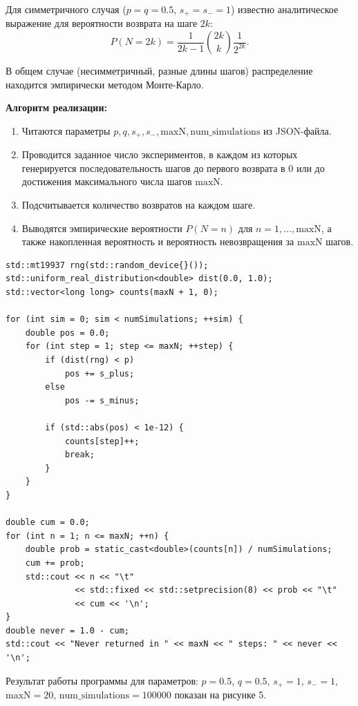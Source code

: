 \documentclass[a4paper]{article}
\theoremstyle{definition}
\begin{document}
Для симметричного случая ($p=q=0.5$, $s_+=s_-=1$) известно аналитическое выражение для вероятности возврата на шаге $2k$:
\begin{equation}
    P(N = 2k) = \frac{1}{2k-1} \binom{2k}{k} \frac{1}{2^{2k}}. \tag{5.3}
\end{equation}

В общем случае (несимметричный, разные длины шагов) распределение находится эмпирически методом Монте-Карло.

\textbf{Алгоритм реализации:}

\begin{enumerate}
    \item Читаются параметры $p, q, s_+, s_-, \text{maxN}, \text{num\_simulations}$ из JSON-файла.
    \item Проводится заданное число экспериментов, в каждом из которых генерируется последовательность шагов до первого возврата в 0 или до достижения максимального числа шагов $\text{maxN}$.
    \item Подсчитывается количество возвратов на каждом шаге.
    \item Выводятся эмпирические вероятности $P(N = n)$ для $n = 1, \dots, \text{maxN}$, а также накопленная вероятность и вероятность невозвращения за $\text{maxN}$ шагов.
\end{enumerate}

\begin{lstlisting}[caption={Основной алгоритм моделирования одномерного блуждания}, label=lst5]
std::mt19937 rng(std::random_device{}());
std::uniform_real_distribution<double> dist(0.0, 1.0);
std::vector<long long> counts(maxN + 1, 0);

for (int sim = 0; sim < numSimulations; ++sim) {
    double pos = 0.0;
    for (int step = 1; step <= maxN; ++step) {
        if (dist(rng) < p)
            pos += s_plus;
        else
            pos -= s_minus;

        if (std::abs(pos) < 1e-12) {
            counts[step]++;
            break;
        }
    }
}

double cum = 0.0;
for (int n = 1; n <= maxN; ++n) {
    double prob = static_cast<double>(counts[n]) / numSimulations;
    cum += prob;
    std::cout << n << "\t"
              << std::fixed << std::setprecision(8) << prob << "\t"
              << cum << '\n';
}
double never = 1.0 - cum;
std::cout << "Never returned in " << maxN << " steps: " << never << '\n';
\end{lstlisting}

Результат работы программы для параметров: $p=0.5$, $q=0.5$, $s_+=1$, $s_-=1$, $\text{maxN}=20$, $\text{num\_simulations}=100000$ показан на рисунке 5.
\end{document}
